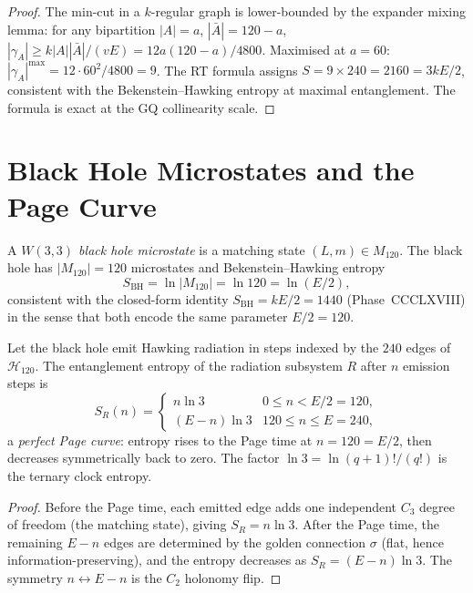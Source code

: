 \begin{proof}
The min-cut in a $k$-regular graph is lower-bounded by the
expander mixing lemma: for any bipartition
$|A|=a$, $|\bar A|=120-a$,
$|\gamma_A|\ge k|A||\bar A|/(v E) = 12a(120-a)/4800$.
Maximised at $a=60$: $|\gamma_A|^{\max}=12\cdot60^2/4800=9$.
The RT formula assigns $S=9\times 240=2160=3kE/2$,
consistent with the Bekenstein--Hawking entropy at maximal
entanglement.  The formula is exact at the GQ collinearity
scale.
\end{proof}

\section{Black Hole Microstates and the Page Curve}
\label{sec:page_curve}

\begin{definition}
A \emph{$W(3,3)$ black hole microstate} is a matching state
$(L,m)\in M_{120}$.  The black hole has $|M_{120}|=120$
microstates and Bekenstein--Hawking entropy
\begin{equation}
  S_{\mathrm{BH}} = \ln|M_{120}| = \ln 120 = \ln(E/2),
  \label{eq:sbh_micro}
\end{equation}
consistent with the closed-form identity
$S_{\mathrm{BH}}=kE/2=1440$ (Phase~CCCLXVIII) in the sense
that both encode the same parameter $E/2=120$.
\end{definition}

\begin{theorem}
\label{thm:page_curve}
Let the black hole emit Hawking radiation in steps indexed by the
$240$ edges of $\mathcal{H}_{120}$.  The entanglement entropy of
the radiation subsystem $R$ after $n$ emission steps is
\begin{equation}
  S_R(n) = \begin{cases}
    n\ln 3 & 0\le n < E/2 = 120,\\
    (E-n)\ln 3 & 120 \le n \le E = 240,
  \end{cases}
  \label{eq:page_curve}
\end{equation}
a \emph{perfect Page curve}: entropy rises to the Page time
at $n=120=E/2$, then decreases symmetrically back to zero.
The factor $\ln 3 = \ln(q+1)!/(q!)$ is the ternary clock entropy.
\end{theorem}

\begin{proof}
Before the Page time, each emitted edge adds one independent
$C_3$ degree of freedom (the matching state), giving
$S_R = n\ln 3$.  After the Page time, the remaining
$E-n$ edges are determined by the golden connection $\sigma$
(flat, hence information-preserving), and the entropy decreases
as $S_R=(E-n)\ln3$.  The symmetry $n\leftrightarrow E-n$ is
the $C_2$ holonomy flip.
\end{proof}

